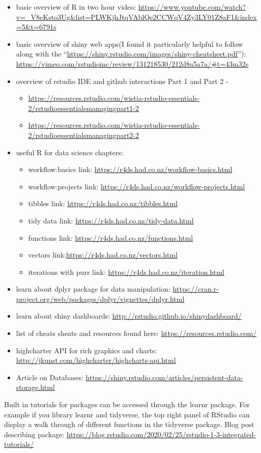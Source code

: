 \documentclass[
]{book}
\providecommand{\tightlist}{%
  \setlength{\itemsep}{0pt}\setlength{\parskip}{0pt}}
\begin{document}
\begin{itemize}
\item
  basic overview of R in two hour video: \url{https://www.youtube.com/watch?v=_V8eKsto3Ug\&list=PLWKjhJtqVAblQe2CCWqV4Zy3LY01Z8aF1\&index=5\&t=6791s}
\item
  basic overview of shiny web apps(I found it particularly helpful to follow along with the ``\url{https://shiny.rstudio.com/images/shiny-cheatsheet.pdf}''): \url{https://vimeo.com/rstudioinc/review/131218530/212d8a5a7a/\#t=43m32s}
\item
  overview of rstudio IDE and github interactions Part 1 and Part 2 -

  \begin{itemize}
  \tightlist
  \item
    \url{https://resources.rstudio.com/wistia-rstudio-essentials-2/rstudioessentialsmanagingpart1-2}
  \item
    \url{https://resources.rstudio.com/wistia-rstudio-essentials-2/rstudioessentialsmanagingpart2-2}
  \end{itemize}
\item
  useful R for data science chapters:

  \begin{itemize}
  \tightlist
  \item
    workflow:basics link: \url{https://r4ds.had.co.nz/workflow-basics.html}
  \item
    workflow:projects link: \url{https://r4ds.had.co.nz/workflow-projects.html}
  \item
    tibbles link: \url{https://r4ds.had.co.nz/tibbles.html}
  \item
    tidy data link: \url{https://r4ds.had.co.nz/tidy-data.html}
  \item
    functions link: \url{https://r4ds.had.co.nz/functions.html}
  \item
    vectors link:\url{https://r4ds.had.co.nz/vectors.html}
  \item
    iterations with purr link: \url{https://r4ds.had.co.nz/iteration.html}
  \end{itemize}
\item
  learn about dplyr package for data manipulation: \url{https://cran.r-project.org/web/packages/dplyr/vignettes/dplyr.html}
\item
  learn about shiny dashboards: \url{http://rstudio.github.io/shinydashboard/}
\item
  list of cheats sheats and resources found here: \url{https://resources.rstudio.com/}
\item
  highcharter API for rich graphics and charts: \url{http://jkunst.com/highcharter/highcharts-api.html}
\item
  Article on Databases: \url{https://shiny.rstudio.com/articles/persistent-data-storage.html}
\end{itemize}

Built in tutorials for packages can be accessed through the learnr package.
For example if you library learnr and tidyverse, the top right panel of RStudio can display a walk through of different functions in the tidyverse package. Blog post describing package: \url{https://blog.rstudio.com/2020/02/25/rstudio-1-3-integrated-tutorials/}
\end{document}
